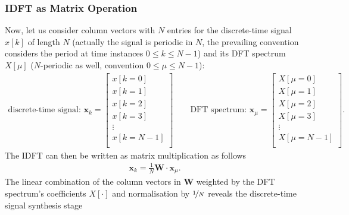 \documentclass[11pt,a4paper,DIV=12]{scrartcl}
\begin{document}
\subsubsection{IDFT as Matrix Operation}
%
Now, let us consider column vectors with $N$ entries
for the discrete-time signal $x[k]$ of length $N$
(actually the signal is periodic in $N$,
the prevailing convention considers the period at time instances
$0 \leq k \leq N-1$)
and its DFT spectrum $X[\mu]$ ($N$-periodic as well,
convention $0\leq \mu \leq N-1$):
%
\begin{align}
\text{discrete-time signal: }
\bm{x}_k =
\begin{bmatrix}
x[k=0]\\
x[k=1]\\
x[k=2]\\
x[k=3]\\
\vdots\\
x[k=N-1]\\
\end{bmatrix}\qquad
\text{DFT spectrum: }
\bm{x}_\mu =
\begin{bmatrix}
X[\mu=0]\\
X[\mu=1]\\
X[\mu=2]\\
X[\mu=3]\\
\vdots\\
X[\mu=N-1]\\
\end{bmatrix}.
\end{align}
%
The IDFT can then be written as matrix multiplication as follows
%
\begin{align}
\label{eq:IDFT_as_Matrix}
\bm{x}_k = \frac{1}{N} \bm{W} \cdot \bm{x}_\mu .
\end{align}
%
The linear combination of the column vectors in $\bm{W}$ weighted by the DFT
spectrum's coefficients $X[\cdot]$ and normalisation by $\nicefrac{1}{N}$
reveals the discrete-time signal synthesis stage
\label{LinComb_for_IDFT}
%
\end{document}

